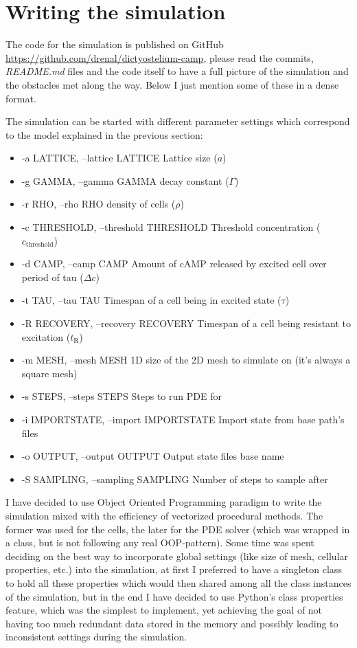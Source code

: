 \documentclass[a4paper,12pt]{article}
\begin{document}
\section{Writing the simulation}

The code for the simulation is published on GitHub\\ \url{https://github.com/drenal/dictyostelium-camp}, please read the commits, \emph{README.md} files and the code itself to have a full picture of the simulation and the obstacles met along the way. Below I just mention some of these in a dense format.  

The simulation can be started with different parameter settings which correspond to the model explained in the previous section:
\begin{itemize}
  \item -a LATTICE, --lattice LATTICE Lattice size ($a$)
  \item -g GAMMA, --gamma GAMMA decay constant ($\Gamma$)
  \item -r RHO, --rho RHO  density of cells ($\rho$)
  \item -c THRESHOLD, --threshold THRESHOLD Threshold concentration ($c_\text{threshold}$)
  \item -d CAMP, --camp CAMP  Amount of cAMP released by excited cell over period of tau ($\Delta c$)
  \item -t TAU, --tau TAU     Timespan of a cell being in excited state ($\tau$)
  \item -R RECOVERY, --recovery RECOVERY Timespan of a cell being resistant to excitation ($t_\text{R}$)
  \item -m MESH, --mesh MESH  1D size of the 2D mesh to simulate on (it's always a square mesh)
  \item -s STEPS, --steps STEPS Steps to run PDE for
  \item -i IMPORTSTATE, --import IMPORTSTATE Import state from base path's files
  \item -o OUTPUT, --output OUTPUT Output state files base name
  \item -S SAMPLING, --sampling SAMPLING Number of steps to sample after
\end{itemize}


I have decided to use Object Oriented Programming paradigm to write the simulation mixed with the efficiency of vectorized procedural methods. The former was used for the cells, the later for the PDE solver (which was wrapped in a class, but is not following any real OOP-pattern). Some time was spent deciding on the best way to incorporate global settings (like size of mesh, cellular properties, etc.) into the simulation, at first I preferred to have a singleton class to hold all these properties which would then shared among all the class instances of the simulation, but in the end I have decided to use Python's class properties feature, which was the simplest to implement, yet achieving the goal of not having too much redundant data stored in the memory and possibly leading to inconsistent settings during the simulation.
\end{document}
